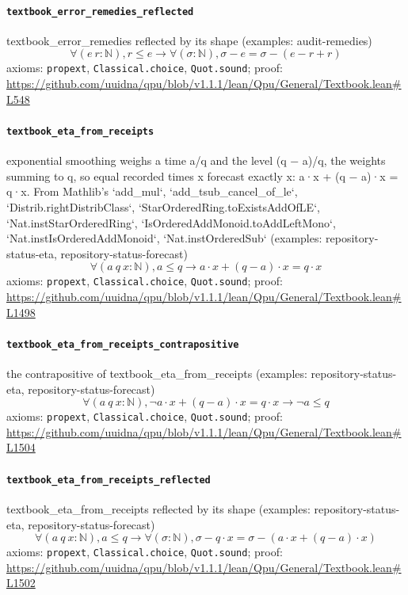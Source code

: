 \documentclass[11pt]{article}
\begin{document}
\paragraph{\texttt{textbook\_error\_remedies\_reflected}}
textbook\_error\_remedies reflected by its shape (examples: audit-remedies)
\[ \forall (e\ r : \mathbb{N}), r \le e \to \forall (\sigma : \mathbb{N}), \sigma - e = \sigma - (e - r + r) \]
\noindent axioms: \texttt{propext}, \texttt{Classical.choice}, \texttt{Quot.sound}; proof: \url{https://github.com/uuidna/qpu/blob/v1.1.1/lean/Qpu/General/Textbook.lean\#L548}

\paragraph{\texttt{textbook\_eta\_from\_receipts}}
exponential smoothing weighs a time a/q and the level (q − a)/q, the weights summing to q, so equal recorded times x forecast exactly x: a·x + (q − a)·x = q·x. From Mathlib's `add\_mul`, `add\_tsub\_cancel\_of\_le`, `Distrib.rightDistribClass`, `StarOrderedRing.toExistsAddOfLE`, `Nat.instStarOrderedRing`, `IsOrderedAddMonoid.toAddLeftMono`, `Nat.instIsOrderedAddMonoid`, `Nat.instOrderedSub` (examples: repository-status-eta, repository-status-forecast)
\[ \forall (a\ q\ x : \mathbb{N}), a \le q \to a \cdot x + (q - a) \cdot x = q \cdot x \]
\noindent axioms: \texttt{propext}, \texttt{Classical.choice}, \texttt{Quot.sound}; proof: \url{https://github.com/uuidna/qpu/blob/v1.1.1/lean/Qpu/General/Textbook.lean\#L1498}

\paragraph{\texttt{textbook\_eta\_from\_receipts\_contrapositive}}
the contrapositive of textbook\_eta\_from\_receipts (examples: repository-status-eta, repository-status-forecast)
\[ \forall (a\ q\ x : \mathbb{N}), \neg a \cdot x + (q - a) \cdot x = q \cdot x \to \neg a \le q \]
\noindent axioms: \texttt{propext}, \texttt{Classical.choice}, \texttt{Quot.sound}; proof: \url{https://github.com/uuidna/qpu/blob/v1.1.1/lean/Qpu/General/Textbook.lean\#L1504}

\paragraph{\texttt{textbook\_eta\_from\_receipts\_reflected}}
textbook\_eta\_from\_receipts reflected by its shape (examples: repository-status-eta, repository-status-forecast)
\[ \forall (a\ q\ x : \mathbb{N}), a \le q \to \forall (\sigma : \mathbb{N}), \sigma - q \cdot x = \sigma - (a \cdot x + (q - a) \cdot x) \]
\noindent axioms: \texttt{propext}, \texttt{Classical.choice}, \texttt{Quot.sound}; proof: \url{https://github.com/uuidna/qpu/blob/v1.1.1/lean/Qpu/General/Textbook.lean\#L1502}
\end{document}
